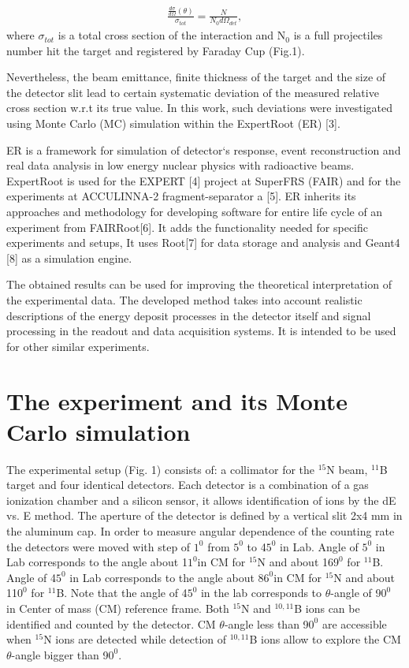 \documentclass[%
 aip,
cp,  %
 amsmath,amssymb,%
 reprint,%
]{revtex4-2}
\begin{document}
\begin{eqnarray}
 \frac{ \frac{d\sigma}{d\Omega}(\theta) }{\sigma_{tot}} = \frac{N}{N_0 d\Omega_{det}},
\end{eqnarray}
where
$\sigma$$_{tot}$ is a total cross section of the interaction
and N$_{0}$ is a full projectiles number hit the target and registered by Faraday Cup (Fig.1).

Nevertheless, the beam emittance, finite thickness of the target and the size of the detector slit lead to certain systematic deviation of the measured relative cross section w.r.t its true value. In this work, such deviations were investigated using Monte Carlo (MC) simulation within the ExpertRoot (ER) [3].

ER is a framework for simulation of detector`s response, event reconstruction and real data analysis in low energy nuclear physics with radioactive beams. ExpertRoot is used for the EXPERT [4] project at SuperFRS (FAIR) and for the experiments at ACCULINNA-2 fragment-separator a [5].  ER inherits its approaches and methodology for developing software for entire life cycle of an experiment from FAIRRoot[6]. It adds the functionality needed for specific experiments and setups, It uses Root[7] for data storage and analysis and Geant4 [8] as a simulation engine.

The obtained results can be used for improving the theoretical interpretation of the experimental data. The developed method takes into account realistic descriptions of the energy deposit processes in the detector itself and signal processing in the readout and data acquisition systems. It is intended to be used for other similar experiments.

\section{The experiment and its Monte Carlo simulation}

The experimental setup (Fig. 1) consists of: a collimator for the ${}^{15}$N beam, ${}^{11}$B target and four identical detectors. Each detector is a combination of a gas ionization chamber and a silicon sensor, it allows identification of ions by the dE vs. E method. The aperture of the detector is defined by a vertical slit 2x4 mm in the aluminum cap. In order to measure angular dependence of the counting rate the detectors were moved with step of $1^0$  from $5^0$ to 4$5^0$ in Lab. Angle of $5^0$ in Lab corresponds to the angle about 1$1^{0}$in CM for ${}^{15}$N and about 16$9^0$ for ${}^{11}$B. Angle of 4$5^0$ in Lab corresponds to the angle about 8$6^{0}$in CM for ${}^{15}$N and about 11$0^0$ for ${}^{11}$B. Note that the angle of 4$5^0$ in the lab corresponds to $\theta$-angle of 9$0^0$  in Center of mass (CM) reference frame. Both ${}^{15}$N and ${}^{10,11}$B ions can be identified and counted by the detector. CM $\theta$-angle less than 9$0^0$  are accessible when ${}^{15}$N ions are detected while detection of ${}^{10,11}$B ions allow to explore the CM $\theta$-angle bigger than 9$0^0$.
\end{document}
